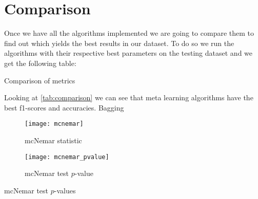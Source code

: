 
\section{Comparison}%
\label{sec:comparison}


Once we have all the algorithms implemented we are going to compare them to find out which yields the best results in our dataset. To do so we run the algorithms with their respective best parameters on the testing dataset and we get the following table:

\begin{table}[H]
\centering
\caption{Comparison of metrics}%
\label{tab:comparison}

\end{table}

Looking at \cref{tab:comparison} we can see that meta learning algorithms have the best f1-scores and accuracies. Bagging 

\begin{figure}[H]
\centering
\texttt{[image: mcnemar]}
\caption{mcNemar statistic}
\end{figure}

\begin{figure}[H]
\centering
\texttt{[image: mcnemar\_pvalue]}
\caption{mcNemar test $p$-value}
\end{figure}

\begin{table}[H]
\centering
\caption{mcNemar test $p$-values}
    
\end{table}